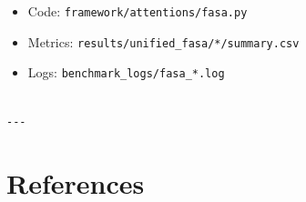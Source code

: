 \begin{itemize}
\item Code: \texttt{framework/attentions/fasa.py}
\item Metrics: \texttt{results/unified\_fasa/*/summary.csv}
\item Logs: \texttt{benchmark\_logs/fasa\_*.log}
\end{itemize}
\begin{lstlisting}

---
\end{lstlisting}


\section{References}

